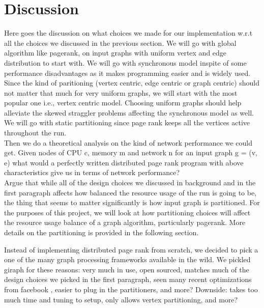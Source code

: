 \section{Discussion}
\label{sec:discussion}

Here goes the discussion on what choices we made for our implementation w.r.t 
all the choices we discussed in the previous section. We will go with global
algorithm like pagerank, on input graphs with uniform vertex and edge 
distribution to start with. We will go with synchronous model inspite of some
performance disadvantages as it makes programming easier and is widely used. 
Since the kind of paritioning (vertex centric, edge centric or graph centric) 
should not matter that much for very uniform graphs, we will start with the most 
popular one i.e., vertex centric model. Choosing uniform graphs should help 
alleviate the skewed straggler problems affecting the synchronous model as well.
We will go with static partitioning since page rank keeps all the vertices active
throughout the run. \\

Then we do a theoretical analysis on the kind of network performance we could 
get. Given nodes of CPU c, memory m and network n for an input graph g = (v, e)
what would a perfectly written distributed page rank program with above 
characteristics give us in terms of network performance? \\


Argue that while all of the design choices we discussed in background and in the 
first paragraph affects how balanced the resource usage of the run is going to be,
the thing that seems to matter significantly is how input graph is partitioned. For 
the purposes of this project, we will look at how partitioning choices will affect
the resource usage balance of a graph algorithm, particularly pagerank. More details
on the partitioning is provided in the following section.


Instead of implementing distributed page rank from scratch, we decided to pick a one 
of the many graph processing frameworks available in the wild. We pickled giraph\cite{giraph}
for these reasons: very much in use, open sourced, matches much of the design choices we 
picked in the first paragraph, seen many recent optimizations from facebook
\cite{Ching:2015:OTE:2824032.2824077}, easier to plug in the partitioners, and more?
Downside: takes too much time and tuning to setup, only allows vertex partitioning, and more?



